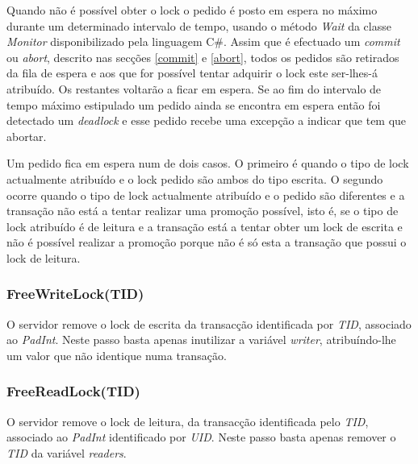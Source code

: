Quando não é possível obter o lock o pedido é posto em espera no máximo durante um determinado intervalo de tempo, usando o método \textit{Wait} da classe \textit{Monitor} disponibilizado pela linguagem C\#. Assim que é efectuado um \textit{commit} ou \textit{abort}, descrito nas secções \ref{commit} e \ref{abort}, todos os pedidos são retirados da fila de espera e aos que for possível tentar adquirir o lock este ser-lhes-á atribuído. Os restantes voltarão a ficar em espera. Se ao fim do intervalo de tempo máximo estipulado um pedido ainda se encontra em espera então foi detectado um \textit{deadlock} e esse pedido recebe uma excepção a indicar que tem que abortar.

Um pedido fica em espera num de dois casos. O primeiro é quando o tipo de lock actualmente atribuído e o lock pedido são ambos do tipo escrita. O segundo ocorre quando o tipo de lock actualmente atribuído e o pedido são diferentes e a transação não está a tentar realizar uma promoção possível, isto é, se o tipo de lock atribuído é de leitura e a transação está a tentar obter um lock de escrita e não é possível realizar a promoção porque não é só esta a transação que possui o lock de leitura.

\subsubsection{FreeWriteLock(TID)}
\label{FreeWriteLock}
O servidor remove o lock de escrita da transacção identificada por \textit{TID}, associado ao \textit{PadInt}.  Neste passo basta apenas inutilizar a variável \textit{writer}, atribuíndo-lhe um valor que não identique numa transação.

\subsubsection{FreeReadLock(TID)}
\label{FreeReadLock}
O servidor remove o lock de leitura, da transacção identificada pelo \textit{TID}, associado ao \textit{PadInt} identificado por \textit{UID}. Neste passo basta apenas remover o \textit{TID} da variável \textit{readers}.